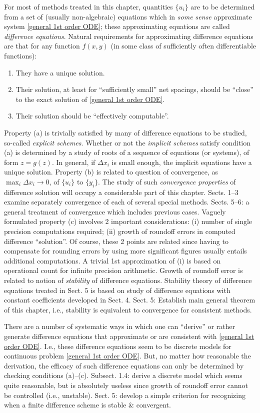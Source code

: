 \documentclass{article}
\begin{document}
\begin{itemize}
\begin{itemize}
		For most of methods treated in this chapter, quantities $\{u_i\}$ are to be determined from a set of (usually non-algebraic) equations which in {\it some sense} approximate system \eqref{general 1st order ODE}; these approximating equations are called {\it difference equations}. Natural requirements for approximating difference equations are that for any function $f(x,y)$ (in some class of sufficiently often differentiable functions):
		\begin{enumerate}
			\item They have a unique solution.
			\item Their solution, at least for ``sufficiently small'' net spacings, should be ``close'' to the exact  solution of \eqref{general 1st order ODE}.
			\item Their solution should be ``effectively computable''.
		\end{enumerate}
		Property (a) is trivially satisfied by many of difference equations to be studied, so-called {\it explicit schemes}. Whether or not the {\it implicit schemes} satisfy condition (a) is determined by a study of roots of a sequence of equations (or systems), of form $z = g(z)$. In general, if $\Delta x_i$ is small enough, the implicit equations have a unique solution. Property (b) is related to question of convergence, as $\max_i \Delta x_i\to0$, of $\{u_i\}$ to $\{y_i\}$. The study of such {\it convergence properties} of difference solution will occupy a considerable part of this chapter. Sects. 1--3 examine separately convergence of each of several special methods. Sects. 5--6: a general treatment of convergence which includes previous cases. Vaguely formulated property (c) involves 2 important considerations: (i) number of single precision computations required; (ii) growth of roundoff errors in computed difference ``solution''. Of course, these 2 points are related since having to compensate for rounding errors by using more significant figures usually entails additional computations. A trivial 1st approximation of (i) is based on operational count for infinite precision arithmetic. Growth of roundoff error is related to notion of {\it stability} of difference equations. Stability theory of difference equations treated in Sect. 5 is based on study of difference equations with constant coefficients developed in Sect. 4. Sect. 5: Establish main general theorem of this chapter, i.e., stability is equivalent to convergence for consistent methods.
		
		There are a number of systematic ways in which one can ``derive'' or rather generate difference equations that approximate or are consistent with \eqref{general 1st order ODE}. I.e., these difference equations seem to be discrete models for continuous problem \eqref{general 1st order ODE}. But, no matter how reasonable the derivation, the efficacy of such difference equations can only be determined by checking conditions (a)--(c). Subsect. 1.4: derive a discrete model which seems quite reasonable, but is absolutely useless since growth of roundoff error cannot be controlled (i.e., unstable). Sect. 5: develop a simple criterion for recognizing when a finite difference scheme is stable \& convergent.
		

\end{itemize}
\end{itemize}
\end{document}

